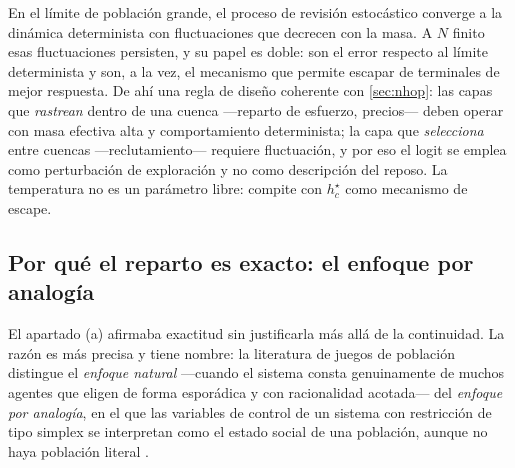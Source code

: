 \begin{observacion}
\label{obs:ruido}
En el límite de población grande, el proceso de revisión estocástico converge a
la dinámica determinista con fluctuaciones que decrecen con la masa. A $N$
finito esas fluctuaciones persisten, y su papel es doble: son el error respecto
al límite determinista y son, a la vez, el mecanismo que permite escapar de
terminales de mejor respuesta. De ahí una regla de diseño coherente con
\cref{sec:nhop}: las capas que \emph{rastrean} dentro de una cuenca —reparto de
esfuerzo, precios— deben operar con masa efectiva alta y comportamiento
determinista; la capa que \emph{selecciona} entre cuencas —reclutamiento—
requiere fluctuación, y por eso el logit se emplea como perturbación de
exploración y no como descripción del reposo. La temperatura no es un parámetro
libre: compite con $h_c^\star$ como mecanismo de escape.
\end{observacion}

\subsection{Por qué el reparto es exacto: el enfoque por analogía}

El apartado (a) afirmaba exactitud sin justificarla más allá de la continuidad.
La razón es más precisa y tiene nombre: la literatura de juegos de población
distingue el \emph{enfoque natural} —cuando el sistema consta genuinamente de
muchos agentes que eligen de forma esporádica y con racionalidad acotada— del
\emph{enfoque por analogía}, en el que las variables de control de un sistema con
restricción de tipo simplex se interpretan como el estado social de una
población, aunque no haya población literal \cite{martinezPiazuelo2025gne}.

